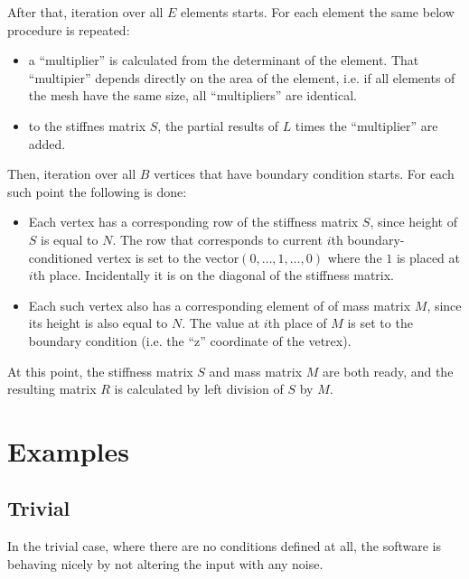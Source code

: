 \documentclass[a4paper,12pt]{article}
\begin{document}
After that, iteration over all $E$ elements starts. For each element the same below procedure is repeated:

\begin{itemize}

  \item a ``multiplier'' is calculated from the determinant of the element. That ``multipier'' depends directly on the
  area of the element, i.e. if all elements of the mesh have the same size, all ``multipliers'' are identical.

  \item to the stiffnes matrix $S$, the partial results of $L$ times the ``multiplier'' are added.

\end{itemize}

Then, iteration over all $B$ vertices that have boundary condition starts. For each such point the following is done:

\begin{itemize}

  \item Each vertex has a corresponding row of the stiffness matrix $S$, since height of $S$ is equal to $N$. The row
  that corresponds to current $i$th boundary-conditioned vertex is set to the vector$(0,\ldots,1,\ldots,0)$ where the
  $1$ is placed at $i$th place. Incidentally it is on the diagonal of the stiffness matrix.
  
  \item Each such vertex also has a corresponding element of of mass matrix $M$, since its height is also equal to $N$.
  The value at $i$th place of $M$ is set to the boundary condition (i.e. the ``z'' coordinate of the vetrex).

\end{itemize}

At this point, the stiffness matrix $S$ and mass matrix $M$ are both ready, and the resulting matrix $R$ is calculated
by left division of $S$ by $M$.

\section{Examples}

\subsection{Trivial}

In the trivial case, where there are no conditions defined at all, the software is behaving nicely by not altering the
input with any noise.
\end{document}
